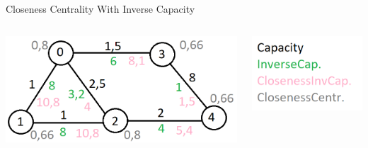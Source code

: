 \documentclass[aspectratio=169,10pt]{beamer}
\begin{document}
\begin{frame}{Closeness Centrality With Inverse Capacity}
\begin{columns}
\begin{column}[t]{0.7\paperwidth}
\includegraphics[width=\textwidth]{images/kai4.png}
\end{column}
\begin{column}[t]{0.3\paperwidth}
\includegraphics[width=\textwidth]{images/kai_legend.png}
\end{column}
\end{columns}
\end{frame}
\end{document}
